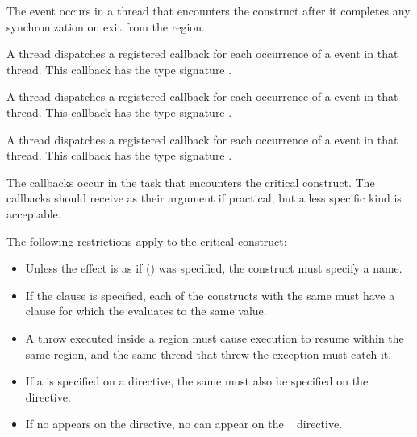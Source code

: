 The  event occurs in a thread that encounters the
 construct after it completes any synchronization on exit 
from the  region.

\tools
A thread dispatches a registered 
callback for each occurrence of a  event
in that thread.
This callback has the type signature .

A thread dispatches a registered 
callback for each occurrence of a  event
in that thread.  This callback has the type signature .

A thread dispatches a registered 
callback for each occurrence of a  event
in that thread.  This callback has the type signature .

The callbacks occur in the task that encounters the critical construct. The 
callbacks should receive  as their  argument 
if practical, but a less specific kind is acceptable.

\restrictions
The following restrictions apply to the critical construct:

\begin{itemize}
\item Unless the effect is as if () was 
      specified, the  construct must specify a name.
\item If the  clause is specified, each of the  
      constructs with the same  must have a  clause 
      for which the  evaluates to the same value.
\end{itemize}

\begin{cppspecific}
\begin{itemize}
\item A throw executed inside a  region must cause execution 
      to resume within the same  region, and the same thread 
      that threw the exception must catch it.
\end{itemize}
\end{cppspecific}

\begin{fortranspecific}
\begin{itemize}
\item If a  is specified on a  directive, the same 
       must also be specified on the ~ directive.
\item If no  appears on the  directive, no  
      can appear on the ~ directive.
\end{itemize}
\end{fortranspecific}

